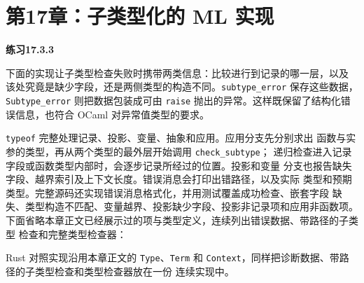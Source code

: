 \section*{第17章：子类型化的 ML 实现}

\begin{taplsolutionentrybox}
\label{sol:translator:17.3.3}
\textbf{练习17.3.3}

下面的实现让子类型检查失败时携带两类信息：比较进行到记录的哪一层，以及
该处究竟是缺少字段，还是两侧类型的构造不同。\texttt{subtype\_error}
保存这些数据，\texttt{Subtype\_error} 则把数据包装成可由 \texttt{raise}
抛出的异常。这样既保留了结构化错误信息，也符合 OCaml 对异常值类型的要求。

\texttt{typeof} 完整处理记录、投影、变量、抽象和应用。应用分支先分别求出
函数与实参的类型，再从两个类型的最外层开始调用 \texttt{check\_subtype}；
递归检查进入记录字段或函数类型内部时，会逐步记录所经过的位置。投影和变量
分支也报告缺失字段、越界索引及上下文长度。错误消息会打印出错路径，以及实际
类型和预期类型。完整源码还实现错误消息格式化，并用测试覆盖成功检查、嵌套字段
缺失、类型构造不匹配、变量越界、投影缺少字段、投影非记录项和应用非函数项。
下面省略本章正文已经展示过的项与类型定义，连续列出错误数据、带路径的子类型
检查和完整类型检查器：


Rust 对照实现沿用本章正文的 \texttt{Type}、\texttt{Term} 和
\texttt{Context}，同样把诊断数据、带路径的子类型检查和类型检查器放在一份
连续实现中。


\end{taplsolutionentrybox}

